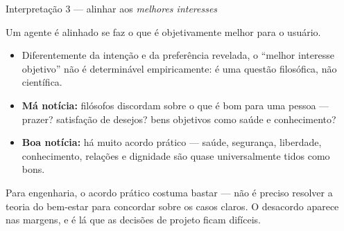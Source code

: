 \documentclass[aspectratio=169, 11pt]{beamer}
\begin{document}
\begin{frame}{Interpretação 3 --- alinhar aos \emph{melhores interesses}}
  \begin{defbox}{}
    Um agente é alinhado se faz o que é objetivamente melhor para o usuário.
  \end{defbox}

  {\small
  \begin{itemize}\setlength{\itemsep}{0.25ex}
    \item Diferentemente da intenção e da preferência revelada, o ``melhor
          interesse objetivo'' \alert{não é determinável empiricamente}: é uma
          questão filosófica, não científica.
    \item \textbf{Má notícia:} filósofos discordam sobre o que é bom para uma
          pessoa --- prazer? satisfação de desejos? bens objetivos como saúde e
          conhecimento?
    \item \textbf{Boa notícia:} há muito acordo prático --- saúde, segurança,
          liberdade, conhecimento, relações e dignidade são quase
          universalmente tidos como bons.
  \end{itemize}}

  \vspace{-0.3em}
  \begin{ideiabox}
    Para engenharia, o acordo prático costuma bastar --- não é preciso resolver
    a teoria do bem-estar para concordar sobre os casos claros. O desacordo
    aparece nas margens, e é lá que as decisões de projeto ficam difíceis.
  \end{ideiabox}
\end{frame}
\end{document}
